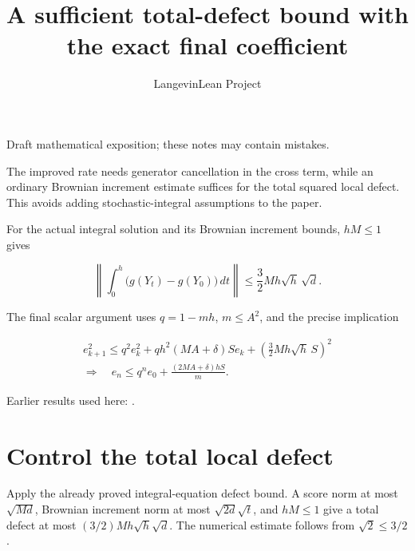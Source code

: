 \documentclass[11pt,a4paper]{article}
\title{\texorpdfstring{A sufficient total-defect bound with the exact final coefficient}{A sufficient total-defect bound with the exact final coefficient}}
\author{LangevinLean Project}
\date{}
\begin{document}
\maketitle
Draft mathematical exposition; these notes may contain mistakes.


The improved rate needs generator cancellation in the cross term, while an ordinary Brownian increment estimate suffices for the total squared local defect. This avoids adding stochastic-integral assumptions to the paper.



For the actual integral solution and its Brownian increment bounds, \(hM\le1\) gives


\[\left\|\int_0^h\bigl(g(Y_t)-g(Y_0)\bigr)\,dt\right\|
\le\frac32Mh\sqrt h\,\sqrt d.\]


The final scalar argument uses \(q=1-mh\), \(m\le A^2\), and the precise implication


\[\begin{gathered}
e_{k+1}^2\le q^2e_k^2+qh^2(MA+\delta)S e_k
+\left(\frac32Mh\sqrt h\,S\right)^2\\
\Longrightarrow\quad e_n\le q^ne_0+\frac{(2MA+\delta)hS}{m}.
\end{gathered}\]

Earlier results used here: \cite[Section~3.11]{LangevinLean2026ULASC}.

\section{\texorpdfstring{Control the total local defect}{Control the total local defect}}


Apply the already proved integral-equation defect bound. A score norm at most \(\sqrt{Md}\), Brownian increment norm at most \(\sqrt{2d}\sqrt t\), and \(hM\le1\) give a total defect at most \((3/2)Mh\sqrt h\sqrt d\). The numerical estimate follows from \(\sqrt 2\le 3/2\).
\end{document}
